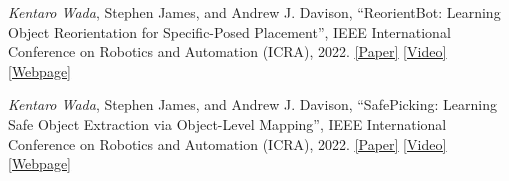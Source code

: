 \documentclass[letterpaper,MMMyyyy,nonstop]{simpleresumecv}
\begin{document}
\begin{body}


\textit{Kentaro Wada}, Stephen James, and Andrew J. Davison,
``ReorientBot: Learning Object Reorientation for Specific-Posed Placement'',
IEEE International Conference on Robotics and Automation (ICRA), 2022.
\href{https://arxiv.org/abs/2202.11092}{\underline{[Paper]}}
\href{https://youtu.be/ahWN84sWWJU}{\underline{[Video]}}
\href{https://reorientbot.wkentaro.com}{\underline{[Webpage]}}

\BigGapNoBreak

\textit{Kentaro Wada}, Stephen James, and Andrew J. Davison,
``SafePicking: Learning Safe Object Extraction via Object-Level Mapping'',
IEEE International Conference on Robotics and Automation (ICRA), 2022.
\href{https://arxiv.org/abs/2202.05832}{\underline{[Paper]}}
\href{https://youtu.be/ejjqiBqRRKo}{\underline{[Video]}}
\href{https://safepicking.wkentaro.com}{\underline{[Webpage]}}

\BigGapNoBreak


\end{body}
\end{document}
